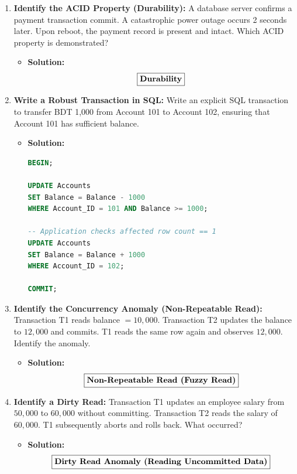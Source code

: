 \begin{enumerate}[label=\textbf{Problem \arabic*.,resume},leftmargin=1.5cm]
\item \textbf{Identify the ACID Property (Durability):}
A database server confirms a payment transaction commit. A catastrophic power outage occurs 2 seconds later. Upon reboot, the payment record is present and intact. Which ACID property is demonstrated?
\begin{itemize}
\item \textbf{Solution:}
\[ \boxed{\text{\textbf{Durability}}} \]
\end{itemize}

\item \textbf{Write a Robust Transaction in SQL:}
Write an explicit SQL transaction to transfer BDT 1,000 from Account 101 to Account 102, ensuring that Account 101 has sufficient balance.
\begin{itemize}
\item \textbf{Solution:}
\begin{lstlisting}[language=SQL]
BEGIN;

UPDATE Accounts
SET Balance = Balance - 1000
WHERE Account_ID = 101 AND Balance >= 1000;

-- Application checks affected row count == 1
UPDATE Accounts
SET Balance = Balance + 1000
WHERE Account_ID = 102;

COMMIT;
\end{lstlisting}
\end{itemize}

\item \textbf{Identify the Concurrency Anomaly (Non-Repeatable Read):}
Transaction T1 reads balance $= 10,000$. Transaction T2 updates the balance to $12,000$ and commits. T1 reads the same row again and observes $12,000$. Identify the anomaly.
\begin{itemize}
\item \textbf{Solution:}
\[ \boxed{\text{\textbf{Non-Repeatable Read (Fuzzy Read)}}} \]
\end{itemize}

\item \textbf{Identify a Dirty Read:}
Transaction T1 updates an employee salary from $50,000$ to $60,000$ without committing. Transaction T2 reads the salary of $60,000$. T1 subsequently aborts and rolls back. What occurred?
\begin{itemize}
\item \textbf{Solution:}
\[ \boxed{\text{\textbf{Dirty Read Anomaly (Reading Uncommitted Data)}}} \]
\end{itemize}


\end{enumerate}
